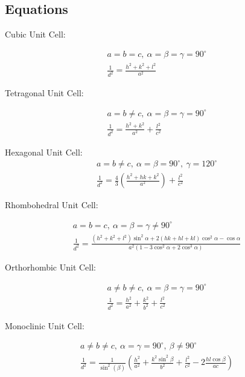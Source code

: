 \documentclass{article}
\begin{document}
\begin{appendices}

\section{Equations \cite{bernarddeniscullity_2015_elements}} 
\label{appendix:Equations}
Cubic Unit Cell:

\begin{gather*}
	\label{eq:cubic}
	a = b =c, \ \alpha = \beta = \gamma = 90^{\circ} \\
	\frac{1}{d^2} = \frac{h^2 + k^2 + l^2}{a^2}
\end{gather*}

Tetragonal Unit Cell:

\begin{gather*}
	\label{eq:tetragonal}
	a = b \neq c, \ \alpha = \beta = \gamma = 90^{\circ} \\
	\frac{1}{d^2} = \frac{h^2 + k^2}{a^2} + \frac{l^2}{c^2}
\end{gather*}

Hexagonal Unit Cell:
\begin{gather*}
	\label{eq:hexagonal}
	a = b \neq c, \ \alpha = \beta = 90^{\circ}, \ \gamma = 120^{\circ} \\
	\frac{1}{d^2} = \frac{4}{3}\left(\frac{h^2 + hk + k^2}{a^2}\right) + \frac{l^2}{c^2}
\end{gather*}

Rhombohedral Unit Cell:

\begin{gather*}
	\label{eq:rhombohedral}
	a = b = c, \ \alpha = \beta = \gamma \neq 90^{\circ} \\
	\frac{1}{d^2} = \frac{(h^2 + k^2 + l^2)\sin^2 \alpha + 2(hk + hl + kl)\cos^2 \alpha - \cos \alpha}{a^2(1-3\cos^2 \alpha + 2\cos^3 \alpha)}
\end{gather*}

Orthorhombic Unit Cell:

\begin{gather*}
	\label{eq:orthorhombic}
	a \neq b \neq c, \ \alpha = \beta = \gamma = 90^{\circ} \\
	\frac{1}{d^2} = \frac{h^2}{a^2} + \frac{k^2}{b^2} + \frac{l^2}{c^2}
\end{gather*}

Monoclinic Unit Cell:

\begin{gather*}
	\label{eq:monoclinic}
	a \neq b \neq c, \ \alpha = \gamma = 90^{\circ}, \ \beta \neq 90^{\circ} \\
	\frac{1}{d^2} = \frac{1}{\sin^2(\beta)}\left(\frac{h^2}{a^2} + \frac{k^2 \sin^2\beta}{b^2}+ \frac{l^2}{c^2} - 2\frac{hl \cos \beta}{ac}\right)
\end{gather*}


\end{appendices}
\end{document}
